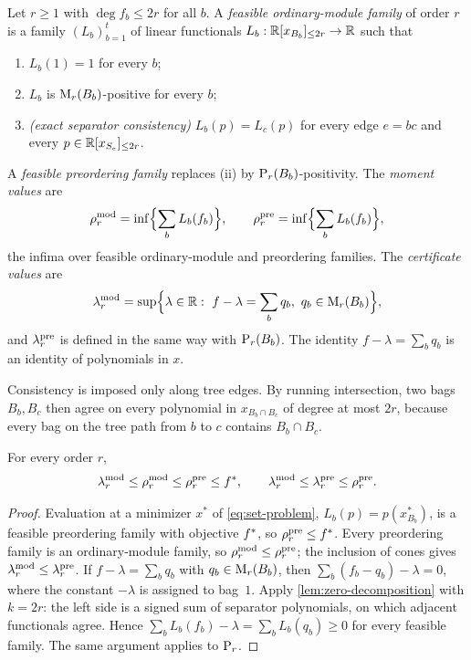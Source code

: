 \begin{definition}\label{def:sparse-hierarchy}
Let $r\ge1$ with $\deg f_b\le2r$ for all $b$. A \emph{feasible
ordinary-module family} of order $r$ is a family $(L_b)_{b=1}^t$ of linear
functionals $L_b:\mathbb{R}[x_{B_b}]_{\le 2r}\to\mathbb{R}$ such that
\begin{enumerate}[label=(\roman*)]
\item $L_b(1)=1$ for every $b$;
\item $L_b$ is $\mathrm{M}_r(B_b)$-positive for every $b$;
\item \emph{(exact separator consistency)} $L_b(p)=L_c(p)$ for every edge
  $e=bc$ and every $p\in\mathbb{R}[x_{S_e}]_{\le 2r}$.
\end{enumerate}
A \emph{feasible preordering family} replaces (ii) by $\mathrm{P}_r(B_b)$-positivity.
The \emph{moment values} are
\[
  \rho^{\mathrm{mod}}_r=\inf\Bigl\{\sum_bL_b(f_b)\Bigr\},\qquad
  \rho^{\mathrm{pre}}_r=\inf\Bigl\{\sum_bL_b(f_b)\Bigr\},
\]
the infima over feasible ordinary-module and preordering families. The
\emph{certificate values} are
\begin{equation}\label{eq:sparse-certificate}
  \lambda^{\mathrm{mod}}_r=\sup\Bigl\{\lambda\in\mathbb{R}:\ f-\lambda=\sum_b q_b,\
  q_b\in\mathrm{M}_r(B_b)\Bigr\},
\end{equation}
and $\lambda^{\mathrm{pre}}_r$ is defined in the same way with $\mathrm{P}_r(B_b)$. The identity
$f-\lambda=\sum_bq_b$ is an identity of polynomials in $x$.
\end{definition}

Consistency is imposed only along tree edges. By running intersection, two
bags $B_b,B_c$ then agree on every polynomial in $x_{B_b\cap B_c}$ of degree
at most $2r$, because every bag on the tree path from $b$ to $c$ contains
$B_b\cap B_c$.

\begin{lemma}\label{lem:weak-duality}
For every order $r$,
\begin{equation}\label{eq:weak-duality}
  \lambda^{\mathrm{mod}}_r\le\rho^{\mathrm{mod}}_r\le\rho^{\mathrm{pre}}_r\le f^{*},\qquad
  \lambda^{\mathrm{mod}}_r\le\lambda^{\mathrm{pre}}_r\le\rho^{\mathrm{pre}}_r .
\end{equation}
\end{lemma}

\begin{proof}
Evaluation at a minimizer $x^*$ of \eqref{eq:set-problem},
$L_b(p)=p(x^*_{B_b})$, is a feasible preordering family with objective
$f^{*}$, so $\rho^{\mathrm{pre}}_r\le f^{*}$. Every preordering family is an
ordinary-module family, so $\rho^{\mathrm{mod}}_r\le\rho^{\mathrm{pre}}_r$; the inclusion of cones
gives $\lambda^{\mathrm{mod}}_r\le\lambda^{\mathrm{pre}}_r$. If $f-\lambda=\sum_bq_b$ with
$q_b\in\mathrm{M}_r(B_b)$, then $\sum_b(f_b-q_b)-\lambda=0$, where the constant
$-\lambda$ is assigned to bag~$1$. Apply \cref{lem:zero-decomposition} with
$k=2r$: the left side is a signed sum of separator polynomials, on which
adjacent functionals agree. Hence $\sum_bL_b(f_b)-\lambda=\sum_bL_b(q_b)\ge0$
for every feasible family. The same argument applies to $\mathrm{P}_r$.
\end{proof}

